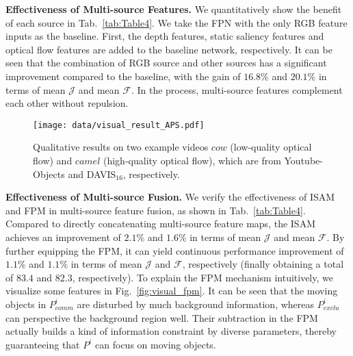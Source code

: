 \documentclass[sigconf]{acmart}
\begin{document}
\textbf{Effectiveness of Multi-source Features.} 
We quantitatively show the benefit of each source in Tab.~\ref{tab:Table4}.
We take the FPN with the only RGB feature inputs as the baseline. First, the depth features, static saliency features and optical flow features are added to the baseline network, respectively. It can be seen that the combination of RGB source and other sources has a significant improvement compared to the baseline, with the gain of $16.8\%$ and $20.1\%$ in terms of mean $\mathcal{J}$ and mean $\mathcal{F}$. In the process, multi-source features complement each other without repulsion.
\begin{figure*}
    \texttt{[image: data/visual\_result\_APS.pdf]}\\ \centering
    \caption{Qualitative results on two example videos $cow$ (low-quality optical flow) and $camel$ (high-quality optical flow), which are from Youtube-Objects and DAVIS$_{16}$, respectively.} 		
    \label{fig:Figure8}
\end{figure*} 

\textbf{Effectiveness of Multi-source Fusion.} We verify the effectiveness of ISAM and FPM in multi-source feature fusion, as shown in Tab.~\ref{tab:Table4}. Compared to directly concatenating multi-source feature maps, the ISAM achieves an improvement of $2.1$\% and $1.6$\% in terms of mean $\mathcal{J}$ and mean $\mathcal{F}$. By further equipping the FPM, it can yield continuous performance improvement of $1.1$\% and $1.1$\% in terms of mean $\mathcal{J}$ and $\mathcal{F}$, respectively (finally obtaining a total of $83.4$ and $82.3$, respectively). To explain the FPM mechanism intuitively, we visualize some features in Fig.~\ref{fig:visual_fpm}. It can be seen that the moving objects in ${P}_{comm}^i$ are disturbed by much background information, whereas ${P}_{exclu}^i$ can perspective the background region well. Their subtraction in the FPM actually builds a kind of information constraint by diverse parameters, thereby guaranteeing that ${P}^i$ can focus on  moving objects.
\begin{table}
	\centering
	\caption{Evaluation of the APS network on both DAVIS$_{16}$ and Youtube-Objects in terms of mean $\mathcal{J}$. }
	\small
	\label{tab:Table5}
	\vspace{-5mm}
\end{table}
\end{document}
